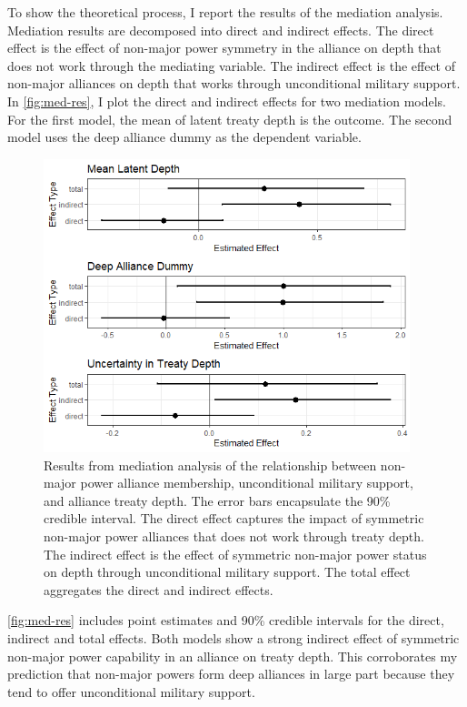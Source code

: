 \documentclass[12pt]{article}
\begin{document}
To show the theoretical process, I report the results of the mediation analysis. 
Mediation results are decomposed into direct and indirect effects. 
The direct effect is the effect of non-major power symmetry in the alliance on depth that does not work through the mediating variable. 
The indirect effect is the effect of non-major alliances on depth that works through unconditional military support. 
In \autoref{fig:med-res}, I plot the direct and indirect effects for two mediation models. 
For the first model, the mean of latent treaty depth is the outcome. 
The second model uses the deep alliance dummy as the dependent variable. 

\begin{figure}[hbtp]
\centering
\includegraphics[width=0.95\textwidth]{../figures/med-res.png}
\caption{Results from mediation analysis of the relationship between non-major power alliance membership, unconditional military support, and alliance treaty depth. The error bars encapsulate the 90\% credible interval. The direct effect captures the impact of symmetric non-major power alliances that does not work through treaty depth. The indirect effect is the effect of symmetric non-major power status on depth through unconditional military support. The total effect aggregates the direct and indirect effects.}
\label{fig:med-res}
\end{figure}


\autoref{fig:med-res} includes point estimates and 90\% credible intervals for the direct, indirect and total effects. 
Both models show a strong indirect effect of symmetric non-major power capability in an alliance on treaty depth. 
This corroborates my prediction that non-major powers form deep alliances in large part because they tend to offer unconditional military support. 
\end{document}
